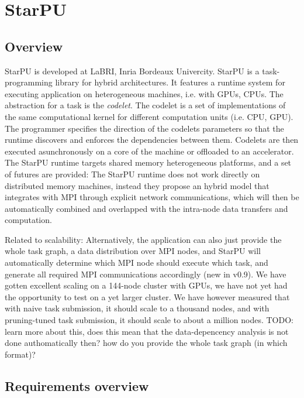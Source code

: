 \section{StarPU}

\subsection{Overview}

StarPU is developed at LaBRI, Inria Bordeaux Univercity. 
StarPU is a task-programming library for hybrid architectures. It features a runtime system for executing application on heterogeneous machines, i.e. with GPUs, CPUs. 
The abstraction for a task is the \emph{codelet}. The codelet is a set of implementations of the same computational kernel for different computation units (i.e. CPU, GPU). 
The programmer specifies the direction of the codelets parameters so that the runtime discovers and enforces the dependencies between them.
Codelets are then executed asunchronously on a core of the machine or offloaded to an accelerator. The StarPU runtime targets shared memory heterogeneous platforms, and a set of futures are provided:
The StarPU runtime does not work directly on distributed memory machines, instead they
propose an hybrid model that integrates with MPI through explicit network communications, which will then be automatically combined and overlapped with the intra-node data transfers and computation.

Related to scalability:
Alternatively, the application can also just provide the whole task graph, a data distribution over MPI nodes, and StarPU will automatically determine which MPI node should execute which task, 
and generate all required MPI communications accordingly (new in v0.9). We have gotten excellent scaling on a 144-node cluster with GPUs, we have not yet had the opportunity to test on a yet larger cluster. 
We have however measured that with naive task submission, it should scale to a thousand nodes, and with pruning-tuned task submission, it should scale to about a million nodes. 
TODO: learn more about this, does this mean that the data-depencency analysis is not done authomatically then? how do you provide the whole task graph (in which format)?



\subsection{Requirements overview}

